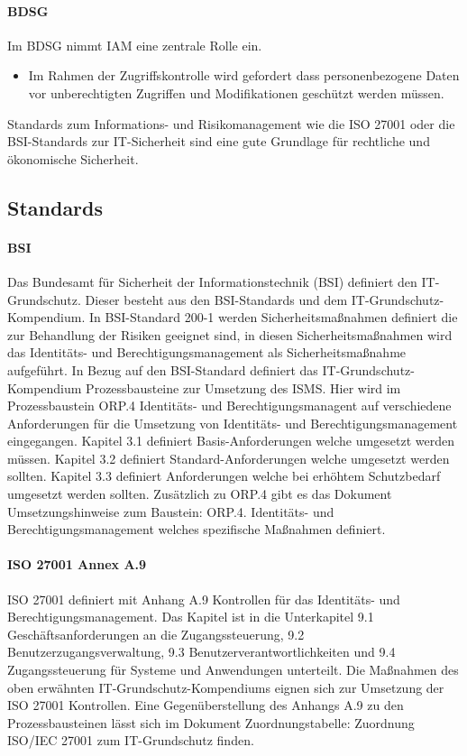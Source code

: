 \documentclass[11pt]{article}
\begin{document}
\paragraph{BDSG}
Im BDSG nimmt IAM eine zentrale Rolle ein.
\begin{itemize}
  \item Im Rahmen der Zugriffskontrolle wird gefordert dass personenbezogene Daten vor unberechtigten Zugriffen und Modifikationen geschützt werden müssen.~\cite{conta2017leitfaden}
\end{itemize}
Standards zum Informations- und Risikomanagement wie die ISO 27001 oder die BSI-Standards zur IT-Sicherheit sind eine gute Grundlage für rechtliche und ökonomische Sicherheit.~\cite{tsolkas2017}
\subsection{Standards}
\paragraph{BSI}
Das Bundesamt für Sicherheit der Informationstechnik (BSI) definiert den IT-Grundschutz. Dieser besteht aus den BSI-Standards und dem IT-Grundschutz-Kompendium. In BSI-Standard 200-1 werden Sicherheitsmaßnahmen definiert die zur Behandlung der Risiken geeignet sind, in diesen Sicherheitsmaßnahmen wird das Identitäts- und Berechtigungsmanagement als Sicherheitsmaßnahme aufgeführt. In Bezug auf den BSI-Standard definiert das IT-Grundschutz-Kompendium Prozessbausteine zur Umsetzung des ISMS. Hier wird im Prozessbaustein \glqq{}ORP.4 Identitäts- und Berechtigungsmanagent\grqq{} auf verschiedene Anforderungen für die Umsetzung von Identitäts- und Berechtigungsmanagement eingegangen. Kapitel 3.1 definiert Basis-Anforderungen welche umgesetzt werden müssen. Kapitel 3.2 definiert Standard-Anforderungen welche umgesetzt werden sollten. Kapitel 3.3 definiert Anforderungen welche bei erhöhtem Schutzbedarf umgesetzt werden sollten. Zusätzlich zu ORP.4 gibt es das Dokument \glqq{}Umsetzungshinweise zum Baustein: ORP.4. Identitäts- und Berechtigungsmanagement\grqq{} welches spezifische Maßnahmen definiert.~\cite{orp4}
\paragraph{ISO 27001 Annex A.9}
ISO 27001 definiert mit Anhang A.9 Kontrollen für das Identitäts- und Berechtigungsmanagement. Das Kapitel ist in die Unterkapitel \glqq{}9.1 Geschäftsanforderungen an die Zugangssteuerung\grqq{}, \glqq{}9.2 Benutzerzugangsverwaltung\grqq{}, \glqq{}9.3 Benutzerverantwortlichkeiten\grqq{} und \glqq{}9.4 Zugangssteuerung für Systeme und Anwendungen\grqq{} unterteilt. Die Maßnahmen des oben erwähnten IT-Grundschutz-Kompendiums eignen sich zur Umsetzung der ISO 27001 Kontrollen. Eine Gegenüberstellung des Anhangs A.9 zu den Prozessbausteinen lässt sich im Dokument \glqq{}Zuordnungstabelle: Zuordnung ISO/IEC 27001 zum IT-Grundschutz\grqq{} finden.
\end{document}
